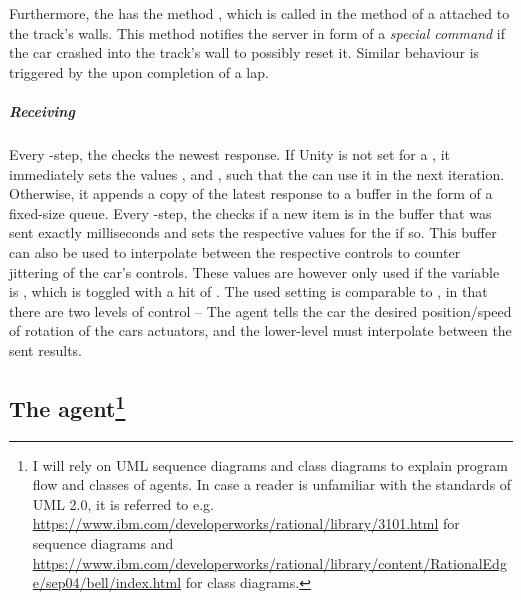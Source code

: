 Furthermore, the  has the method , which is called in the method  of a  attached to the track's walls. This method notifies the server in form of a \textit{special command} if the car crashed into the track's wall to possibly reset it. Similar behaviour is triggered by the  upon completion of a lap.

\subparagraph{Receiving}
Every -step, the  checks the newest response. If Unity is not set for a , it immediately sets the values ,  and , such that the  can use it in the next iteration. Otherwise, it appends a copy of the latest response to a buffer in the form of a fixed-size queue. Every -step, the  checks if a new item is in the buffer that was sent exactly  milliseconds and sets the respective values for the  if so. This buffer can also be used to interpolate between the respective controls to counter jittering of the car's controls. These values are however only used if the variable  is , which is toggled with a hit of . The used setting is comparable to \cite{wawrzynski_control_2015}, in that there are two levels of control -- The agent tells the car the desired position/speed of rotation of the cars actuators, and the lower-level must interpolate between the sent results.





\subsection{The agent\footnote{I will rely on UML sequence diagrams and class diagrams to explain program flow and classes of agents. In case a reader is unfamiliar with the standards of UML 2.0, it is referred to e.g. \url{https://www.ibm.com/developerworks/rational/library/3101.html} for sequence diagrams and \url{https://www.ibm.com/developerworks/rational/library/content/RationalEdge/sep04/bell/index.html} for class diagrams.}}

\label{ch:theagent}

